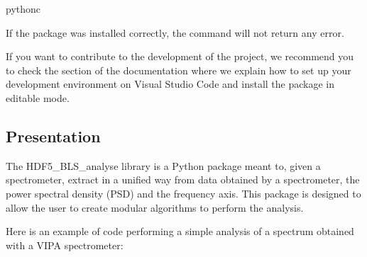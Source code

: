 \documentclass[letterpaper,10pt,english]{sphinxmanual}
\begin{document}
\begin{sphinxVerbatim}[commandchars=\\\{\}]
python\PYGZhy{}c
\end{sphinxVerbatim}

\sphinxAtStartPar
If the package was installed correctly, the command will not return any error.

\sphinxAtStartPar
If you want to contribute to the development of the project, we recommend you to check the {\hyperref[\detokenize{source/developer/setup:developer-setup-vscode}]{}} section of the documentation where we explain how to set up your development environment on Visual Studio Code and install the package in editable mode.


\subsection{Presentation}
\label{\detokenize{source/hdf5_bls_analyse_package:presentation}}\label{\detokenize{source/hdf5_bls_analyse_package:hdf5-bls-analyse-package-presentation}}
\sphinxAtStartPar
The HDF5\_BLS\_analyse library is a Python package meant to, given a spectrometer, extract in a unified way from data obtained by a spectrometer, the power spectral density (PSD) and the frequency axis. This package is designed to allow the user to create modular algorithms to perform the analysis.

\sphinxAtStartPar
Here is an example of code performing a simple analysis of a spectrum obtained with a VIPA spectrometer:
\end{document}
